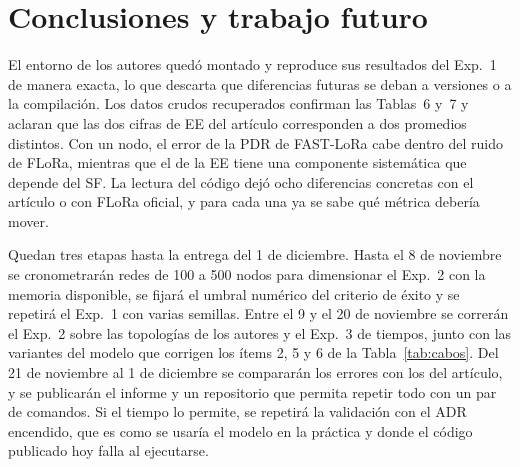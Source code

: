\documentclass[conference,a4paper]{IEEEtran}
\begin{document}
\section{Conclusiones y trabajo futuro}

El entorno de los autores quedó montado y reproduce sus resultados del Exp.~1 de manera exacta, lo que descarta que diferencias futuras se deban a versiones o a la compilación. Los datos crudos recuperados confirman las Tablas~6 y~7 y aclaran que las dos cifras de EE del artículo corresponden a dos promedios distintos. Con un nodo, el error de la PDR de FAST-LoRa cabe dentro del ruido de FLoRa, mientras que el de la EE tiene una componente sistemática que depende del SF. La lectura del código dejó ocho diferencias concretas con el artículo o con FLoRa oficial, y para cada una ya se sabe qué métrica debería mover.

Quedan tres etapas hasta la entrega del 1 de diciembre. Hasta el 8 de noviembre se cronometrarán redes de 100 a 500 nodos para dimensionar el Exp.~2 con la memoria disponible, se fijará el umbral numérico del criterio de éxito y se repetirá el Exp.~1 con varias semillas. Entre el 9 y el 20 de noviembre se correrán el Exp.~2 sobre las topologías de los autores y el Exp.~3 de tiempos, junto con las variantes del modelo que corrigen los ítems 2, 5 y 6 de la Tabla~\ref{tab:cabos}. Del 21 de noviembre al 1 de diciembre se compararán los errores con los del artículo, y se publicarán el informe y un repositorio que permita repetir todo con un par de comandos. Si el tiempo lo permite, se repetirá la validación con el ADR encendido, que es como se usaría el modelo en la práctica y donde el código publicado hoy falla al ejecutarse.
\end{document}
